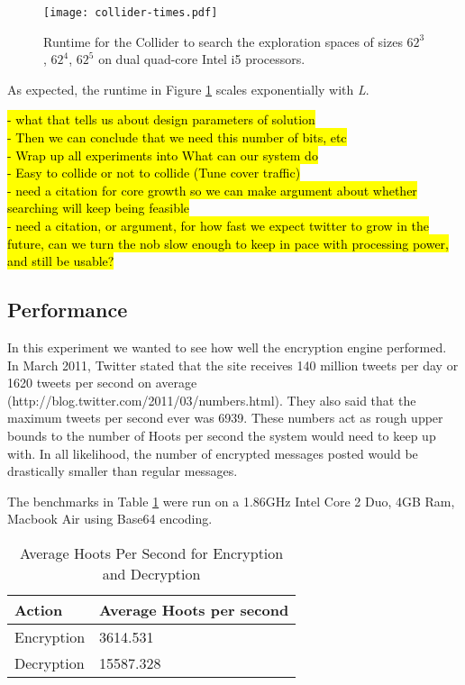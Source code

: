 \begin{figure}
\begin{center}
\texttt{[image: collider-times.pdf]}
\caption{Runtime for the Collider to search the exploration spaces of sizes $62^3$, $62^4$, $62^5$ on dual quad-core Intel i5 processors.
\label{fig:collider-times}
}
\end{center}
\end{figure}


As expected, the runtime in Figure \ref{fig:collider-times} scales exponentially with \textit{L}. 


\hl{
- what that tells us about design parameters of solution \\
- Then we can conclude that we need this number of bits, etc\\
- Wrap up all experiments into What can our system do\\
- Easy to collide or not to collide (Tune cover traffic)\\
- need a citation for core growth so we can make argument about whether searching will keep being feasible\\
- need a citation, or argument, for how fast we expect twitter to grow in the future, can we turn the nob slow enough to keep in pace with processing power, and still be usable? \\
}

\subsection{Performance}

In this experiment we wanted to see how well the encryption engine performed. In March 2011, Twitter stated that the site receives 140 million tweets per day or 1620 tweets per second on average (http://blog.twitter.com/2011/03/numbers.html). They also said that the maximum tweets per second ever was 6939. These numbers act as rough upper bounds to the number of Hoots per second the system would need to keep up with. In all likelihood, the number of encrypted messages posted would be drastically smaller than regular messages.

The benchmarks in Table \ref{tab:hps} were run on a 1.86GHz Intel Core 2 Duo, 4GB Ram, Macbook Air using Base64 encoding.


\begin{table}
\caption{Average Hoots Per Second for Encryption and Decryption
\label{tab:hps}
}
\begin{center}
    \begin{tabular}{ l  l }
	\hline
	Action & Average Hoots per second \\ \hline
	Encryption & 3614.531 \\
	Decryption & 15587.328 \\ \hline
    \end{tabular}
\end{center}
\end{table}

